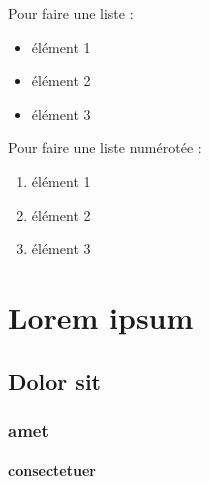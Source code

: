 Pour faire une liste :
\begin{itemize}
    \item élément 1
    \item élément 2
    \item élément 3
\end{itemize}

Pour faire une liste numérotée :
\begin{enumerate}
    \item élément 1
    \item élément 2
    \item élément 3
\end{enumerate}

\section{Lorem ipsum}
\lipsum[1-1] %
\subsection{Dolor sit}
\lipsum[1-1] %
\subsubsection{amet}
\lipsum[1-1] %
\paragraph{consectetuer}
\lipsum[1-1] %
